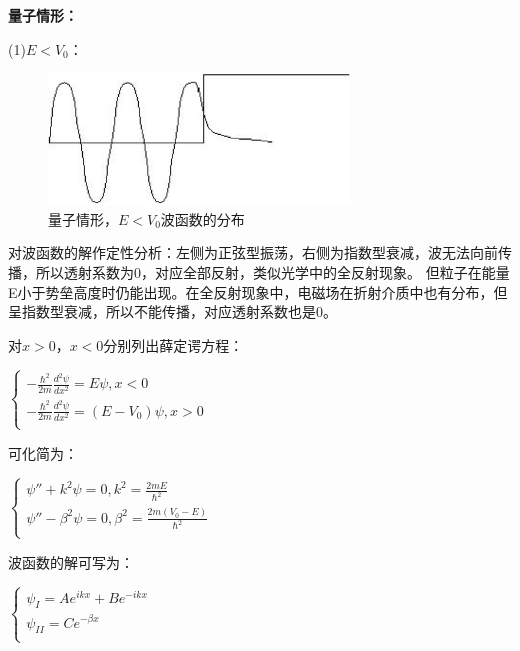 \textbf{量子情形：}

(1)$E < V_0 $：

\begin{figure}[h]
\begin{center}
\includegraphics[clip,width=8cm]{1DProblem/11-2.ps}
\caption{量子情形，$E < V_0$波函数的分布}
\end{center}
\end{figure}

对波函数的解作定性分析：左侧为正弦型振荡，右侧为指数型衰减，波无法向前传播，所以透射系数为0，对应全部反射，类似光学中的全反射现象。
但粒子在能量E小于势垒高度时仍能出现。在全反射现象中，电磁场在折射介质中也有分布，但呈指数型衰减，所以不能传播，对应透射系数也是0。

对$x>0$，$x<0$分别列出薛定谔方程：

\begin{center}
$\left\{ \begin{array}{l}
  - \frac{{\hbar ^2 }}{{2m}}\frac{{d^2 \psi }}{{dx^2 }} = E\psi ,x < 0 \\
  - \frac{{\hbar ^2 }}{{2m}}\frac{{d^2 \psi }}{{dx^2 }} = \left( {E - V{}_0} \right)\psi ,x > 0 \\
 \end{array} \right.$
\end{center}

可化简为：

\begin{center}
$\left\{ \begin{array}{l}
 \psi '' + k^2 \psi  = 0,k^2  = \frac{{2mE}}{{\hbar ^2 }} \\
 \psi '' - \beta ^2 \psi  = 0,\beta ^2  = \frac{{2m\left( {V_0  - E} \right)}}{{\hbar ^2 }} \\
 \end{array} \right.$
\end{center}

波函数的解可写为：

\begin{center}
$\left\{ \begin{array}{l}
 \psi _I  = Ae^{ikx}  + Be^{ - ikx}  \\
 \psi _{II}  = Ce^{ - \beta x}  \\
 \end{array} \right.$
\end{center}

